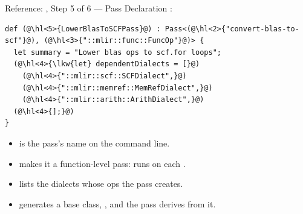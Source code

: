 \documentclass[aspectratio=169,10pt]{beamer}
\begin{document}
\begin{frame}[fragile]{Reference: , Step 5 of 6 --- Pass Declaration}
  :
\begin{lstlisting}[language=ods,basicstyle=\ttfamily\scriptsize]
def (@\hl<5>{LowerBlasToSCFPass}@) : Pass<(@\hl<2>{"convert-blas-to-scf"}@), (@\hl<3>{"::mlir::func::FuncOp"}@)> {
  let summary = "Lower blas ops to scf.for loops";
  (@\hl<4>{\lkw{let} dependentDialects = [}@)
    (@\hl<4>{"::mlir::scf::SCFDialect",}@)
    (@\hl<4>{"::mlir::memref::MemRefDialect",}@)
    (@\hl<4>{"::mlir::arith::ArithDialect",}@)
  (@\hl<4>{];}@)
}
\end{lstlisting}
  \vspace{0.4em}
  \begin{itemize}
    \item<2->  is the pass's name on the
       command line.
    \item<3->  makes it a function-level pass:
       runs on each .
    \item<4->  lists the dialects whose ops the pass
      creates.
    \item<5->  generates a base class,
      , and the pass derives from it.
  \end{itemize}
\end{frame}
\end{document}
